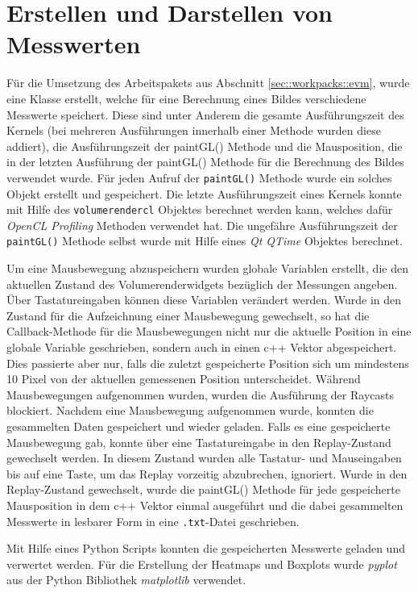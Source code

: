 \section{Erstellen und Darstellen von Messwerten}
Für die Umsetzung des Arbeitspakets aus Abschnitt \ref{sec::workpacks::evm}, wurde eine Klasse erstellt, welche für eine Berechnung eines Bildes verschiedene Messwerte speichert.
Diese sind unter Anderem die gesamte Ausführungszeit des Kernels (bei mehreren Ausführungen innerhalb einer Methode wurden diese addiert), die Ausführungszeit der paintGL() Methode und die Mausposition, die in der letzten Ausführung der paintGL() Methode für die Berechnung des Bildes verwendet wurde.
Für jeden Aufruf der \texttt{paintGL()} Methode wurde ein solches Objekt erstellt und gespeichert.
Die letzte Ausführungszeit eines Kernels konnte mit Hilfe des \texttt{volumerendercl} Objektes berechnet werden kann, welches dafür \emph{OpenCL Profiling} Methoden verwendet hat.
Die ungefähre Ausführungszeit der \texttt{paintGL()} Methode selbst wurde mit Hilfe eines \emph{Qt QTime} Objektes berechnet.

Um eine Mausbewegung abzuspeichern wurden globale Variablen erstellt, die den aktuellen Zustand des Volumerenderwidgets bezüglich der Messungen angeben.
Über Tastatureingaben können diese Variablen verändert werden.
Wurde in den Zustand für die Aufzeichnung einer Mausbewegung gewechselt, so hat die Callback-Methode für die Mausbewegungen nicht nur die aktuelle Position in eine globale Variable geschrieben, sondern auch in einen c++ Vektor abgespeichert.
Dies passierte aber nur, falls die zuletzt gespeicherte Position sich um mindestens 10 Pixel von der aktuellen gemessenen Position unterscheidet.
Während Mausbewegungen aufgenommen wurden, wurden die Ausführung der Raycasts blockiert.
Nachdem eine Mausbewegung aufgenommen wurde, konnten die gesammelten Daten gespeichert und wieder geladen.
Falls es eine gespeicherte Mausbewegung gab, konnte über eine Tastatureingabe in den Replay-Zustand gewechselt werden.
In diesem Zustand wurden alle Tastatur- und Mauseingaben bis auf eine Taste, um das Replay vorzeitig abzubrechen, ignoriert.
Wurde in den Replay-Zustand gewechselt, wurde die paintGL() Methode für jede gespeicherte Mausposition in dem c++ Vektor einmal ausgeführt und die dabei gesammelten Messwerte in lesbarer Form in eine \texttt{.txt}-Datei geschrieben.

Mit Hilfe eines Python Scripts konnten die gespeicherten Messwerte geladen und verwertet werden.
Für die Erstellung der Heatmaps und Boxplots wurde \emph{pyplot} aus der Python Bibliothek \emph{matplotlib} verwendet.